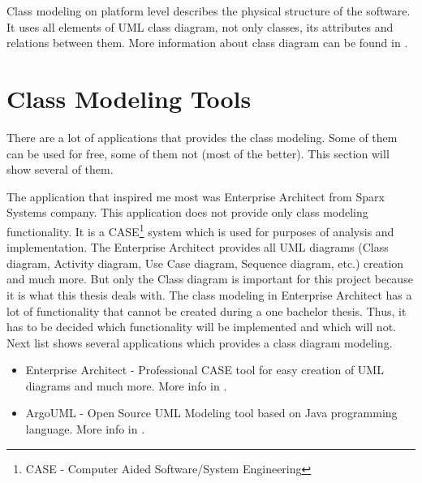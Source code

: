 Class modeling on platform level describes the physical structure of the software. It uses all elements of UML class diagram, not only classes, its attributes and relations between them. More information about class diagram can be found in \cite{UMLDistilled}.

\section{Class Modeling Tools}

There are a lot of applications that provides the class modeling. Some of them can be used for free, some of them not (most of the better). This section will show several of them.

The application that inspired me most was Enterprise Architect from Sparx Systems \cite{sparxsystemsweb} company. This application does not provide only class modeling functionality. It is a CASE\footnote{CASE - Computer Aided Software/System Engineering} system which is used for purposes of analysis and implementation. The Enterprise Architect provides all UML diagrams (Class diagram, Activity diagram, Use Case diagram, Sequence diagram, etc.) creation and much more. But only the Class diagram is important for this project because it is what this thesis deals with. The class modeling in Enterprise Architect has a lot of functionality that cannot be created during a one bachelor thesis. Thus, it has to be decided which functionality will be implemented and which will not. Next list shows several applications which provides a class diagram modeling.

\begin{itemize}
    \item Enterprise Architect - Professional CASE tool for easy creation of UML diagrams and much more. More info in \cite{sparxsystemsweb}.
    \item ArgoUML - Open Source UML Modeling tool based on Java programming language. More info in \cite{ArgoUMLWeb}.
\end{itemize}

